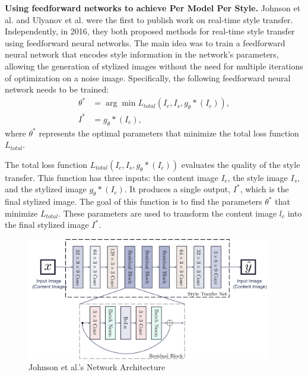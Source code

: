 \textbf{Using feedforward networks to achieve Per Model Per Style.} Johnson et al.\citep{22johnson2016perceptual} and Ulyanov et al.\citep{23ulyanov2016texture} were the first to publish work on real-time style transfer. Independently, in 2016, they both proposed methods for real-time style transfer using feedforward neural networks. The main idea was to train a feedforward neural network that encodes style information in the network's parameters, allowing the generation of stylized images without the need for multiple iterations of optimization on a noise image. Specifically, the following feedforward neural network needs to be trained: 
\begin{equation}
    \begin{aligned}
        \theta^* &= \arg\min L_{total}\left(I_c,I_s,g_\theta*(I_c)\right),\\
        I^*&=g_\theta*(I_c),
    \end{aligned}
\end{equation}
where $\theta^*$ represents the optimal parameters that minimize the total loss function $L_{total}$.

The total loss function $L_{total}\left(I_c,I_s,g_\theta*(I_c)\right)$ evaluates the quality of the style transfer. This function has three inputs: the content image $I_c$, the style image $I_s$, and the stylized image $g_\theta*(I_c)$. It produces a single output, $I^*$, which is the final stylized image. The goal of this function is to find the parameters $\theta^*$ that minimize $L_{total}$. These parameters are used to transform the content image $l_c$ into the final stylized image $I^*$.
\begin{figure}[!htbp]%
    \centering%
    \includegraphics[width=0.95\textwidth]{fig/Figure_3_Johnson_et_al's_Network_Architecture_[22].pdf}
    \caption{Johnson et al.'s Network Architecture \citep{22johnson2016perceptual}}\label{fig4_Johnson}
\end{figure}

